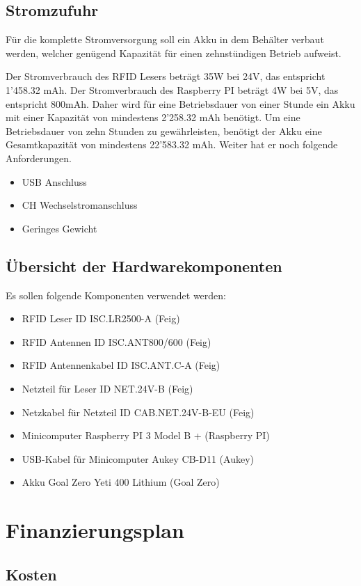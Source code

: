 \subsection{Stromzufuhr}
Für die komplette Stromversorgung soll ein Akku in dem Behälter verbaut werden, welcher genügend Kapazität für einen zehnstündigen Betrieb aufweist.

Der Stromverbrauch des RFID Lesers beträgt 35W bei 24V, das entspricht 1'458.32 mAh.
Der Stromverbrauch des Raspberry PI beträgt 4W bei 5V, das entspricht 800mAh.
Daher wird für eine Betriebsdauer von einer Stunde ein Akku mit einer Kapazität von mindestens 2'258.32 mAh benötigt. Um eine Betriebsdauer von zehn Stunden zu gewährleisten, benötigt der Akku eine Gesamtkapazität von mindestens 22'583.32 mAh.
Weiter hat er noch folgende Anforderungen.
\begin{itemize}
	\item USB Anschluss
	\item CH Wechselstromanschluss
	\item Geringes Gewicht
\end{itemize}

\subsection{Übersicht der Hardwarekomponenten}
Es sollen folgende Komponenten verwendet werden:
\begin{itemize}
	\item RFID Leser ID ISC.LR2500-A  (Feig)
	\item RFID Antennen ID ISC.ANT800/600 (Feig)
	\item RFID Antennenkabel ID ISC.ANT.C-A (Feig)
	\item Netzteil für Leser ID NET.24V-B (Feig)
	\item Netzkabel für Netzteil ID CAB.NET.24V-B-EU  (Feig)
	\item Minicomputer Raspberry PI 3 Model B + (Raspberry PI)
	\item USB-Kabel für Minicomputer Aukey CB-D11 (Aukey)
	\item Akku Goal Zero Yeti 400 Lithium (Goal Zero)
\end{itemize}

\section{Finanzierungsplan}

\subsection{Kosten}

